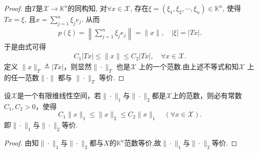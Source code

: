 \documentclass[../../main.tex]{subfiles}%
\begin{document}
\begin{proof}
由$T$是$\mathscr{X} \rightarrow \mathbb{K} ^n$的同构知, 对$\forall x\in \mathscr{X}$, 存在$\xi = (\xi _1,\xi _2,\cdots,\xi _n) \in \mathbb{K} ^n$, 使得$Tx=\xi$, 且$x=\sum\limits_{j=1}^n \xi _je_j$. 从而
\begin{align*}
p(\xi) = \left\| \sum\limits_{j=1}^n \xi _je_j \right\| = \|x\|, \quad |\xi|=|Tx|.
\end{align*}
于是由式可得
\begin{align*}
C_1|Tx|\leqslant \|x\| \leqslant C_2|Tx|, \quad \forall x\in \mathscr{X}.
\end{align*}
定义 $\|x\|_T \triangleq |Tx|$，则显然$\|\cdot\|_T$ 也是$\mathscr{X}$ 上的一个范数.由上述不等式和知$\mathscr{X}$ 上的任一范数$\|\cdot\|$ 都与 $\|\cdot\|_T$ 等价.
\end{proof}

\begin{corollary}\label{corollary:有限维赋范线性空间的范数都等价11}
设$\mathscr{X}$是一个有限维线性空间，若$\|\cdot\|_1$与$\|\cdot\|_2$都是$\mathscr{X}$上的范数，则必有常数$C_1,C_2>0$，使得
$$C_1\|x\|_1 \leqslant \|x\|_2 \leqslant C_2\|x\|_1 \quad (\forall x \in \mathscr{X}).$$
即$\|\cdot\|_1$与$\|\cdot\|_2$等价.
\end{corollary}
\begin{proof}
由知$\|\cdot\|_1$与$\|\cdot\|_2$都与$X$的$\mathbb{K}^n$范数等价,故$\|\cdot\|_1$与$\|\cdot\|_2$等价.
\end{proof}
\end{document}
